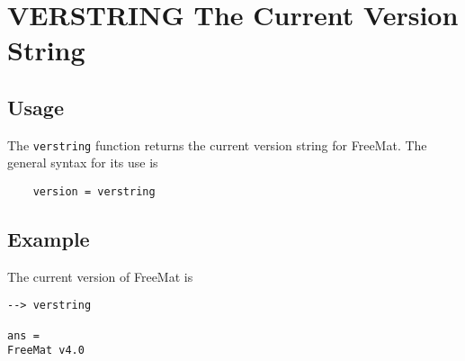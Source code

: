 \section{VERSTRING The Current Version String}

\subsection{Usage}

The \verb|verstring| function returns the current version string for
FreeMat.  The general syntax for its use is
\begin{verbatim}
    version = verstring
\end{verbatim}
\subsection{Example}

The current version of FreeMat is
\begin{verbatim}
--> verstring

ans = 
FreeMat v4.0
\end{verbatim}
